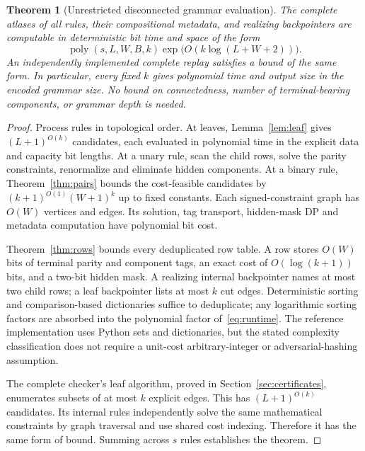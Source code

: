 \documentclass[11pt,letterpaper]{article}
\newtheorem{theorem}{Theorem}[section]
\theoremstyle{definition}
\theoremstyle{remark}\newtheorem{remark}[theorem]{Remark}
\newcommand{\poly}{\operatorname{poly}}
\begin{document}
\begin{theorem}[Unrestricted disconnected grammar evaluation]\label{thm:evaluate}
The complete atlases of all rules, their compositional metadata, and realizing backpointers are computable in deterministic bit time and space of the form
\begin{equation}\label{eq:runtime}
 \poly(s,L,W,B,k)\exp\!\bigl(O(k\log(L+W+2))\bigr).
\end{equation}
An independently implemented complete replay satisfies a bound of the same form. In particular, every fixed $k$ gives polynomial time and output size in the encoded grammar size. No bound on connectedness, number of terminal-bearing components, or grammar depth is needed.
\end{theorem}
\begin{proof}
Process rules in topological order. At leaves, Lemma~\ref{lem:leaf} gives $(L+1)^{O(k)}$ candidates, each evaluated in polynomial time in the explicit data and capacity bit lengths. At a unary rule, scan the child rows, solve the parity constraints, renormalize and eliminate hidden components. At a binary rule, Theorem~\ref{thm:pairs} bounds the cost-feasible candidates by $(k+1)^{O(1)}(W+1)^k$ up to fixed constants. Each signed-constraint graph has $O(W)$ vertices and edges. Its solution, tag transport, hidden-mask DP and metadata computation have polynomial bit cost.

Theorem~\ref{thm:rows} bounds every deduplicated row table. A row stores $O(W)$ bits of terminal parity and component tags, an exact cost of $O(\log(k+1))$ bits, and a two-bit hidden mask. A realizing internal backpointer names at most two child rows; a leaf backpointer lists at most $k$ cut edges. Deterministic sorting and comparison-based dictionaries suffice to deduplicate; any logarithmic sorting factors are absorbed into the polynomial factor of~\eqref{eq:runtime}. The reference implementation uses Python sets and dictionaries, but the stated complexity classification does not require a unit-cost arbitrary-integer or adversarial-hashing assumption.

The complete checker's leaf algorithm, proved in Section~\ref{sec:certificates}, enumerates subsets of at most $k$ explicit edges. This has $(L+1)^{O(k)}$ candidates. Its internal rules independently solve the same mathematical constraints by graph traversal and use shared cost indexing. Therefore it has the same form of bound. Summing across $s$ rules establishes the theorem.
\end{proof}
\end{document}
